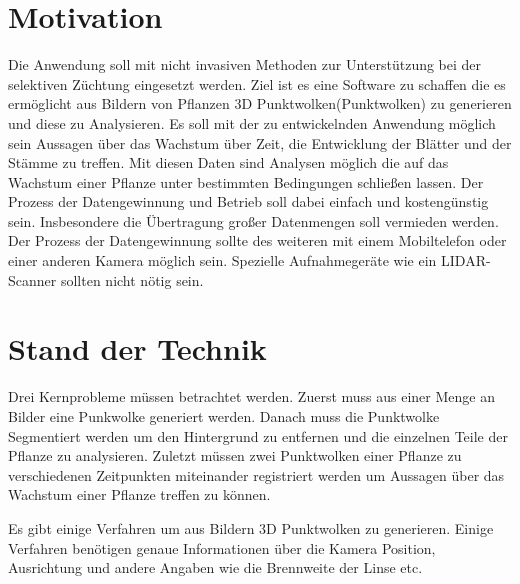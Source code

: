 \documentclass[12pt,titlepage, twoside]{article}
\begin{document}
\section{Motivation}
\label{sec:einleitung}
Die Anwendung soll mit nicht invasiven Methoden zur Unterstützung bei der selektiven Züchtung eingesetzt werden.
Ziel ist es eine Software zu schaffen die es ermöglicht aus Bildern von Pflanzen 3D Punktwolken(Punktwolken) zu generieren und diese zu Analysieren.
Es soll mit der zu entwickelnden Anwendung möglich sein Aussagen über das Wachstum über Zeit, die Entwicklung der Blätter und der Stämme zu treffen. 
Mit diesen Daten sind Analysen möglich die auf das Wachstum einer Pflanze unter bestimmten Bedingungen schließen lassen.
Der Prozess der Datengewinnung und Betrieb soll dabei einfach und kostengünstig sein. Insbesondere die Übertragung großer Datenmengen soll vermieden werden.
Der Prozess der Datengewinnung sollte des weiteren mit einem Mobiltelefon oder einer anderen Kamera möglich sein. Spezielle Aufnahmegeräte wie ein LIDAR-Scanner sollten nicht nötig sein.


\newpage
\section{Stand der Technik}
\label{sec:stand}
%

Drei Kernprobleme müssen betrachtet werden. Zuerst muss aus einer Menge an Bilder eine Punkwolke generiert werden. Danach muss die Punktwolke Segmentiert werden um den Hintergrund zu entfernen und die einzelnen Teile der Pflanze zu analysieren. 
Zuletzt müssen zwei Punktwolken einer Pflanze zu verschiedenen Zeitpunkten miteinander registriert werden um Aussagen über das Wachstum einer Pflanze treffen zu können.

Es gibt einige Verfahren um aus Bildern 3D Punktwolken zu generieren. Einige Verfahren benötigen genaue Informationen über die Kamera Position, Ausrichtung und andere Angaben wie die Brennweite der Linse etc. 
\end{document}

